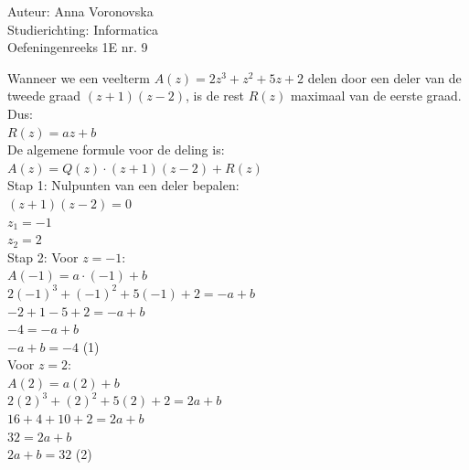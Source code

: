 \documentclass[a4paper]{article}
\begin{document}
  
\noindent \large Auteur: Anna Voronovska \\
\noindent \large Studierichting: Informatica\\
\noindent \large Oefeningenreeks 1E nr. 9\\

\medskip

\normalsize


Wanneer we een veelterm $A(z)=2z^3 + z^2 + 5z + 2$ delen door een deler van de tweede graad $(z + 1)(z - 2)$, is de rest $R(z)$ maximaal van de eerste graad. Dus:\\

$R(z) = az + b$\\

De algemene formule voor de deling is:\\

$A(z) = Q(z) \cdot (z + 1)(z - 2) + R(z)$\\

Stap 1: Nulpunten van een deler bepalen:\\

$(z + 1)(z - 2)=0$\\

$z_1 = -1$\\

$z_2 = 2$\\

Stap 2: Voor $z = -1$:\\

$A(-1) = a \cdot (-1) + b$\\

$2(-1)^3 + (-1)^2 + 5(-1) + 2 = -a + b$\\

$-2 + 1 - 5 + 2 = -a + b$\\

$-4 = -a + b $\\

$-a + b = -4$ (1)\\

Voor $z = 2$:\\

$A(2) = a(2) + b$\\

$2(2)^3 + (2)^2 + 5(2) + 2 = 2a + b$\\

$16 + 4 + 10 + 2 = 2a + b$\\

$32 = 2a + b$\\

$2a + b = 32$ (2)\\
\end{document}

